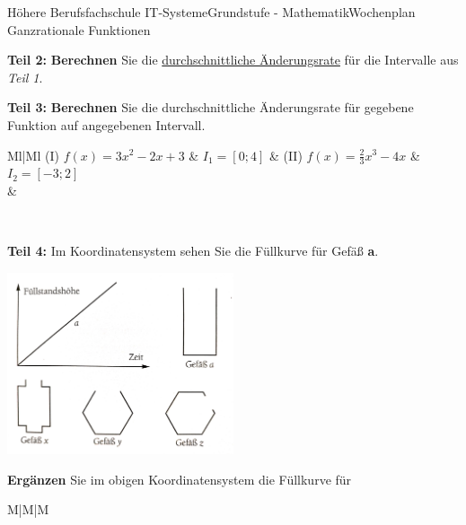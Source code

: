 \documentclass[oneside,openany,headings=optiontotoc,11pt,numbers=noenddot]{scrreprt}
\begin{document}
\begin{worksheet}{Höhere Berufsfachschule IT-Systeme}{Grundstufe - Mathematik}{Wochenplan Ganzrationale Funktionen}
\begin{framed}
		\end{framed}
		\begin{framed}
			\noindent
			\textbf{Teil 2:} \textbf{Berechnen} Sie die \underline{durchschnittliche Änderungsrate} für die Intervalle aus \textit{Teil 1}.
		\end{framed}
		\normalsize
		\newpage
		\begin{framed}
			\noindent
			\textbf{Teil 3:} \textbf{Berechnen} Sie die durchschnittliche Änderungsrate für gegebene Funktion auf angegebenen Intervall.\\
			\par\noindent
			\renewcommand{\arraystretch}{2}
			\begin{tabularx}{\textwidth}{Ml|Ml}
				(I) \(f(x) = 3x^2 - 2x +3\) & \(I_1 = [0;4]\) & (II) \(f(x) = \frac{2}{3}x^3 - 4x\) & \(I_2 = [-3;2]\)\\
				\hline
				 & \multicolumn{2}{c}{\(I_3 = [-2,5;2]\)}
			\end{tabularx}\\
			\renewcommand{\arraystretch}{1}
			\par\bigskip\noindent
		\end{framed}
		\begin{framed}
			\noindent
			\textbf{Teil 4:} Im Koordinatensystem sehen Sie die Füllkurve für Gefäß \textbf{a}.
			\par\noindent
			\begin{center}
				\includegraphics[width=0.5\textwidth]{../99_Bilder/WP/WP12_T4.jpg}
			\end{center}
			\textbf{Ergänzen} Sie im obigen Koordinatensystem die Füllkurve für\\
			\par\noindent
			\renewcommand{\arraystretch}{2}
			\begin{tabularx}{\textwidth}{M|M|M}

\end{tabularx}
\end{framed}
\end{worksheet}
\end{document}
